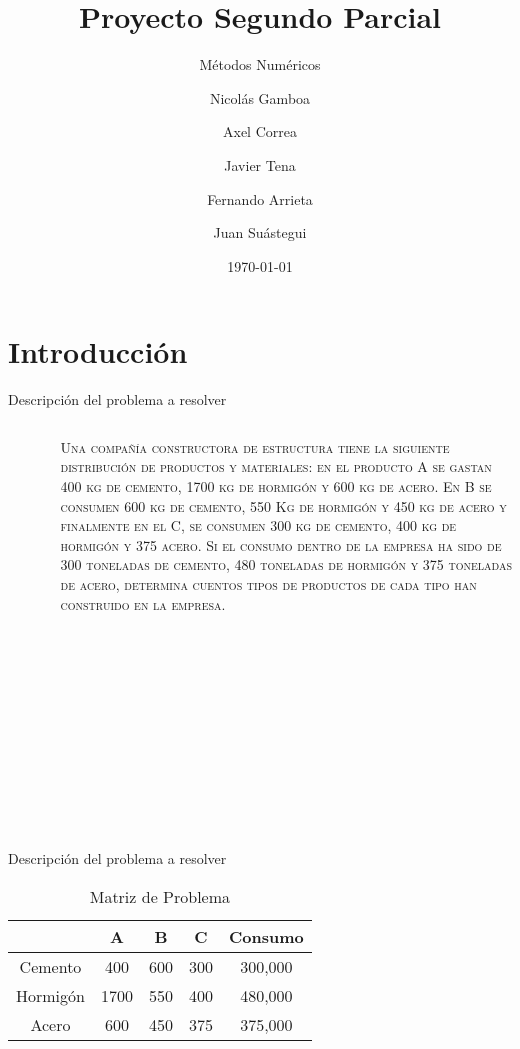 \documentclass{cubeamer}
\title{Proyecto Segundo Parcial}
\subtitle{Métodos Numéricos}
\author[Equipo 4]{Nicolás Gamboa \and Axel Correa \and Javier Tena \and Fernando Arrieta \and Juan Suástegui}
\date{\today} %
\institute[Instituto Tecnológico y de Estudios Superiores de Monterrey]{Instituto Tecnológico y de Estudios Superiores de Monterrey}
\begin{document}
\maketitle

\cutoc

\section{Introducción}

\begin{frame}{Descripción del problema a resolver}
    \begin{columns}
        \begin{column}{0.3\textwidth}
            \begin{figure}
                \centering
                \texttt{[image: img/Constru.jpg]}
            \end{figure}
        \end{column}
        \begin{column}{0.7\textwidth}
        \textsc{Una compañía constructora de estructura tiene la siguiente distribución de productos y materiales: en el producto A se gastan 400 kg de cemento, 1700 kg de hormigón y 600 kg de acero. En B se consumen 600 kg de cemento, 550 Kg de hormigón y 450 kg de acero y finalmente en el C, se consumen 300 kg de cemento, 400 kg de hormigón y 375 acero.
        Si el consumo dentro de la empresa ha sido de 300 toneladas de cemento, 480 toneladas de hormigón y 375 toneladas de acero, determina cuentos tipos de productos de cada tipo han construido en la empresa.}
        \end{column}
    \end{columns}
\end{frame}

\begin{frame}{Descripción del problema a resolver}
    \begin{table}[t]
    \begin{center}
    \begin{tabular}{| c | c | c | c | c | }
    \hline
         & A & B & C & Consumo \\ \hline
        Cemento & 400 & 600 & 300 & 300,000 \\
        Hormigón & 1700 & 550 & 400 & 480,000 \\
        Acero & 600 & 450 & 375 & 375,000 \\ \hline
    \end{tabular}
    \caption{Matriz de Problema}
    \end{center}
    \end{table}
\end{frame}
\end{document}
